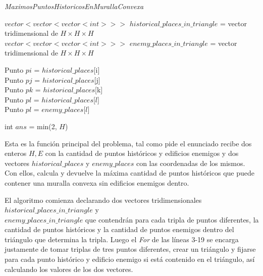 \begin{algorithm}[H]
	\caption{\textit{MaximosPuntosHistoricosEnMurallaConvexa}}

	$vector<vector<vector<int>>>$ $historical\_places\_in\_triangle$ = vector tridimensional de $H \times H \times H$ \\
	$vector<vector<vector<int>>>$ $enemy\_places\_in\_triangle$ = vector tridimensional de $H \times H \times H$

	 {
        Punto $pi$ = $historical\_places$[i] \\
        Punto $pj$ = $historical\_places$[j] \\
        Punto $pk$ = $historical\_places$[k] \\
         {
            Punto $pl$ = $historical\_places$[$l$] \\
        }
         {
            Punto $pl$ = $enemy\_places$[$l$] \\
        }
    }

	int $ans$ = min(2, $H$) \\

\end{algorithm}

Esta es la función principal del problema, tal como pide el enunciado recibe dos enteros $H,E$ con la cantidad
de puntos históricos y edificios enemigos y dos vectores $historical\_places$ y $enemy\_places$ con las coordenadas
de los mismos.
Con ellos, calcula y devuelve la máxima cantidad de puntos históricos que puede contener una
muralla convexa sin edificios enemigos dentro.

El algoritmo comienza declarando dos vectores tridimensionales $historical\_places\_in\_triangle$ y \\
$enemy\_places\_in\_triangle$ que contendrán para cada tripla de puntos diferentes, la cantidad de puntos históricos
y la cantidad de puntos enemigos dentro del triángulo que determina la tripla.
Luego el \textit{For} de las líneas 3-19 se encarga justamente de tomar triplas de tres puntos diferentes,
crear un triángulo y fijarse para cada punto histórico y edificio enemigo si está contenido en el triángulo, así
calculando los valores de los dos vectores.

